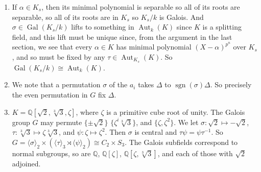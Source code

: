 \documentclass{article}
\newcommand\QQ{\mathbb Q}
\DeclareMathOperator\Gal{Gal}
\DeclareMathOperator\Aut{Aut}
\DeclareMathOperator\sgn{sgn}
\begin{document}
\begin{enumerate}
   \item If $\alpha \in K_s$, then its minimal polynomial is separable so all of
      its roots are separable, so all of its roots are in $K_s$ so $K_s/k$ is
      Galois. And $\sigma \in \Gal(K_s/k)$ lifts to something in $\Aut_k(K)$
      since $K$ is a splitting field, and this lift must be  unique since, from
      the argument in the last section, we see that every $\alpha \in K$ has
      minimal polynomial $(X-\alpha)^{p^n}$ over $K_s$, and so must be fixed by
      any $\tau \in \Aut_{K_s}(K)$. So $\Gal(K_s/k) \cong \Aut_k(K)$.

   \item We note that a permutation $\sigma$ of the $a_i$ takes $\Delta$ to
      $\sgn(\sigma)\Delta$. So precisely the even permutation in $G$ fix
      $\Delta$.

   \item $K = \QQ[\sqrt2,\sqrt[3]3,\zeta]$, where $\zeta$ is a primitive cube
      root of unity. The Galois group $G$ may permute $\{\pm\sqrt2\}$
      $\{\zeta^i\sqrt[3]3\}$, and $\{\zeta,\zeta^2\}$. We let
      $\sigma:\sqrt2\mapsto-\sqrt2$, $\tau:\sqrt[3]3\mapsto\zeta\sqrt[3]3$, and
      $\psi:\zeta\mapsto\zeta^2$. Then $\sigma$ is central and $\tau\psi =
      \psi\tau^{-1}$. So $G = \langle \sigma \rangle_2 \times (\langle \tau
      \rangle_3 \rtimes \langle \psi \rangle_2) \cong C_2 \times S_3$. The
      Galois subfields correspond to normal subgroups, so are $\QQ$,
      $\QQ[\zeta]$, $\QQ[\zeta, \sqrt[3]3]$, and each of those with $\sqrt2$
      adjoined.

\end{enumerate}
\end{document}
